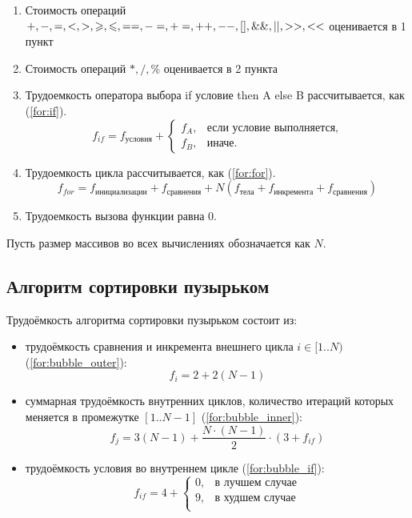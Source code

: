 \begin{enumerate}
	\item Стоимость операций $+,-,=,<,>,\geq, \leq, ==, -=, +=, ++, --, [\space], \&\&, ||, >>, <<$ оценивается в 1 пункт
    \item Стоимость операций $*, /, \% $ оценивается в 2 пункта

	\item Трудоемкость оператора выбора if условие then A else B рассчитывается, как (\ref{for:if}).
	\begin{equation}
	\label{for:if}
	f_{if} = f_{\text{условия}} +
	\begin{cases}
	f_A, & \text{если условие выполняется,}\\
	f_B, & \text{иначе.}
	\end{cases}
	\end{equation}
	\item Трудоемкость цикла рассчитывается, как (\ref{for:for}).
	\begin{equation}
	\label{for:for}
	f_{for} = f_{\text{инициализации}} + f_{\text{сравнения}} + N(f_{\text{тела}} + f_{\text{инкремента}} + f_{\text{сравнения}})
	\end{equation}
	\item Трудоемкость вызова функции равна 0.
\end{enumerate}

Пусть размер массивов во всех вычислениях обозначается как $N$.

\subsection{Алгоритм сортировки пузырьком}

Трудоёмкость алгоритма сортировки пузырьком состоит из:
\begin{itemize}
	\item трудоёмкость сравнения и инкремента внешнего цикла $i \in [1..N)$ (\ref{for:bubble_outer}):
	\begin{equation}
	\label{for:bubble_outer}
	f_{i} = 2 + 2(N - 1)
	\end{equation}
	\item суммарная трудоёмкость внутренних циклов, количество итераций которых меняется в промежутке $[1..N-1]$ (\ref{for:bubble_inner}):
	\begin{equation}
	\label{for:bubble_inner}
	f_{j} = 3(N - 1) + \frac{N \cdot (N - 1)}{2} \cdot (3 + f_{if})
	\end{equation}
	\item трудоёмкость условия во внутреннем цикле (\ref{for:bubble_if}):
	\begin{equation}
	\label{for:bubble_if}
	f_{if} = 4 + \begin{cases}
	0, & \text{в лучшем случае}\\
	9, & \text{в худшем случае}\\
	\end{cases}
	\end{equation}
\end{itemize}

